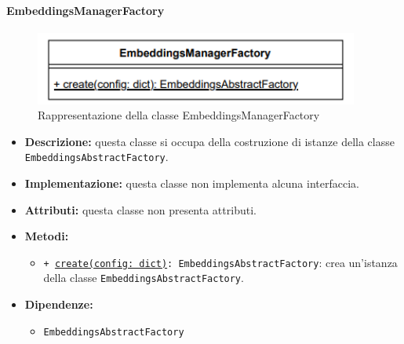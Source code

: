 \paragraph{EmbeddingsManagerFactory} \label{EmbeddingsManagerFactory}
\begin{figure}[H]
    \centering
    \includegraphics[width=0.95\textwidth]{assets/Backend/embeddings_manager_factory.png}
    \caption{Rappresentazione della classe EmbeddingsManagerFactory}
  \end{figure}
\begin{itemize}
    \item \textbf{Descrizione:} questa classe si occupa della costruzione di istanze della classe \texttt{EmbeddingsAbstractFactory}.
    \item \textbf{Implementazione:} questa classe non implementa alcuna interfaccia.
    \item \textbf{Attributi:} questa classe non presenta attributi.
    \item \textbf{Metodi:}
    \begin{itemize}
        \item \texttt{+ \underline{create(config: dict)}: EmbeddingsAbstractFactory}: crea un'istanza della classe \texttt{EmbeddingsAbstractFactory}.
    \end{itemize}
    \item \textbf{Dipendenze:}
    \begin{itemize}
        \item \texttt{EmbeddingsAbstractFactory}
    \end{itemize}
\end{itemize} 

